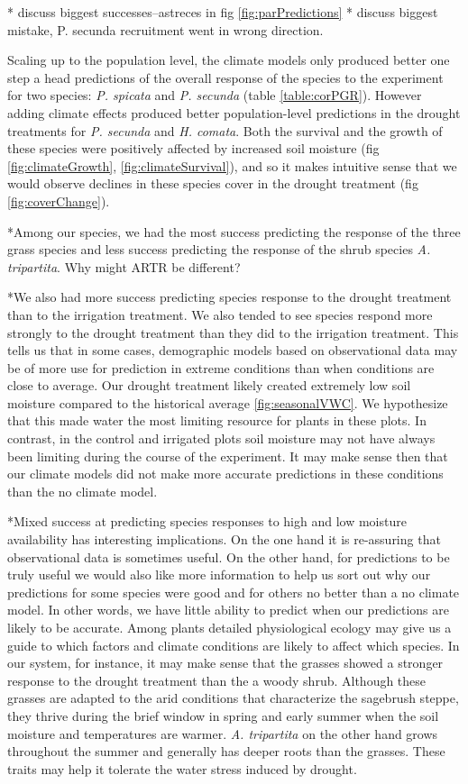 \documentclass[11pt]{article}
\begin{document}
\begin{doublespacing}
* discuss biggest successes--astreces in fig \ref{fig:parPredictions}
* discuss biggest mistake, P. secunda recruitment went in wrong direction. 
 
Scaling up to the population level, the climate models only produced better one step a head predictions of the overall response of the species to the experiment for two species: \textit{P. spicata} and \textit{P. secunda} (table \ref{table:corPGR}). However adding climate effects produced better population-level predictions in the drought treatments for \textit{P. secunda} and \textit{H. comata}.  Both the survival and the growth of these species were positively affected by increased soil moisture (fig \ref{fig:climateGrowth}, \ref{fig:climateSurvival}), and so it makes intuitive sense that we would observe declines in these species cover in the drought treatment (fig \ref{fig:coverChange}). 

*Among our species, we had the most success predicting the response of the three grass species and less success predicting the response of the shrub species \textit{A. tripartita}.    Why might ARTR be different? 

*We also had more success predicting species response to the drought treatment than to the irrigation treatment. We also tended to see species respond more strongly to the drought treatment than they did to the irrigation treatment.  This tells us that in some cases, demographic models based on observational data may be of more use for prediction in extreme conditions than when conditions are close to average.  Our drought treatment likely created extremely low soil moisture compared to the historical average \ref{fig:seasonalVWC}. We hypothesize that this made water the most limiting resource for plants in these plots. In contrast, in the control and irrigated plots soil moisture may not have always been limiting during the course of the experiment.  It may make sense then that our climate models did not make more accurate predictions in these conditions than the no climate model.

*Mixed success at predicting species responses to high and low moisture availability has interesting implications.  On the one hand it is re-assuring that observational data is sometimes useful. On the other hand, for predictions to be truly useful we would also like more information to help us sort out why our predictions for some species were good and for others no better than a no climate model.  In other words, we have little ability to predict when our predictions are likely to be accurate.  Among plants detailed physiological ecology may give us a guide to which factors and climate conditions are likely to affect which species.  In our system, for instance, it may make sense that the grasses showed a stronger response to the drought treatment than the a woody shrub.  Although these grasses are adapted to the arid conditions that characterize the sagebrush steppe, they thrive during the brief window in spring and early summer when the soil moisture and temperatures are warmer.  \textit{A. tripartita} on the other hand grows throughout the summer and generally has deeper roots than the grasses. These traits may help it tolerate the water stress induced by drought. 


\end{doublespacing}
\end{document}
